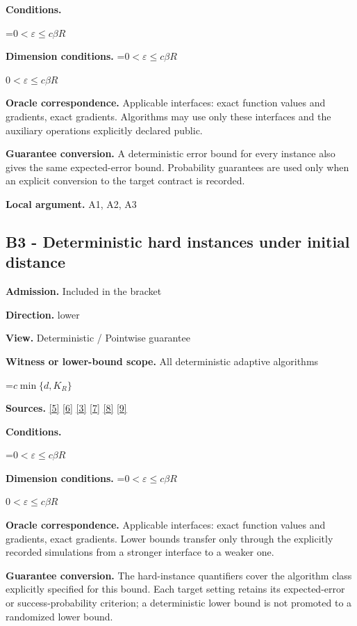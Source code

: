 \documentclass[10pt,a4paper]{article}
\newcommand{\AtlasMath}[1]{\par\begingroup\centering\setbox0=\hbox{$\displaystyle #1$}\ifdim\wd0>1.4\linewidth\typeout{ATLAS WIDE FORMULA: \the\wd0}\fi\ifdim\wd0>\linewidth\resizebox{\linewidth}{!}{\box0}\else\box0\fi\par\endgroup}
\newcommand{\AtlasInlineMath}[1]{\begingroup\setbox0=\hbox{$#1$}\ifdim\wd0>.4\linewidth\endgroup\AtlasMath{#1}\else\endgroup$#1$\fi}
\begin{document}
\textbf{Conditions.} 
\AtlasMath{0<\varepsilon\le c\beta R}


\textbf{Dimension conditions.} \AtlasInlineMath{0<\varepsilon\le c\beta R}

\textbf{Oracle correspondence.} Applicable interfaces: exact function values and gradients, exact gradients. Algorithms may use only these interfaces and the auxiliary operations explicitly declared public.

\textbf{Guarantee conversion.} A deterministic error bound for every instance also gives the same expected-error bound. Probability guarantees are used only when an explicit conversion to the target contract is recorded.

\textbf{Local argument.} A1, A2, A3

\subsection{B3 - Deterministic hard instances under initial distance}
\textbf{Admission.} Included in the bracket

\textbf{Direction.} lower

\textbf{View.} Deterministic / Pointwise guarantee

\textbf{Witness or lower-bound scope.} All deterministic adaptive algorithms

\AtlasMath{c\min\{d,K_R\}}
\textbf{Sources.} \href{https://arxiv.org/pdf/2101.09740v2}{[5]} \href{https://arxiv.org/pdf/2609.33360v2}{[6]} \href{https://arxiv.org/pdf/2609.10874}{[3]} \href{https://arxiv.org/pdf/1405.4980}{[7]} \href{https://www2.isye.gatech.edu/~nemirovs/MOR_AccuracyCertificates.pdf}{[8]} \href{https://arxiv.org/pdf/2609.20701}{[9]}

\textbf{Conditions.} 
\AtlasMath{0<\varepsilon\le c\beta R}


\textbf{Dimension conditions.} \AtlasInlineMath{0<\varepsilon\le c\beta R}

\textbf{Oracle correspondence.} Applicable interfaces: exact function values and gradients, exact gradients. Lower bounds transfer only through the explicitly recorded simulations from a stronger interface to a weaker one.

\textbf{Guarantee conversion.} The hard-instance quantifiers cover the algorithm class explicitly specified for this bound. Each target setting retains its expected-error or success-probability criterion; a deterministic lower bound is not promoted to a randomized lower bound.
\end{document}
